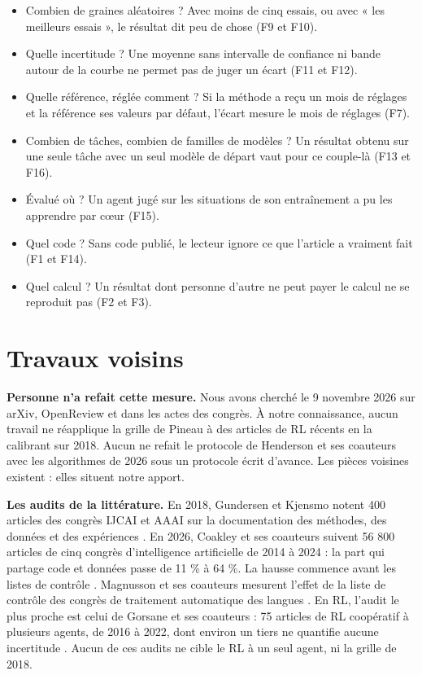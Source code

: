 \documentclass[11pt,a4paper]{article}
\providecommand{\tightlist}{\setlength{\itemsep}{0pt}\setlength{\parskip}{0pt}}
\begin{document}
\begin{itemize}
\tightlist
\item
  Combien de graines aléatoires ? Avec moins de cinq essais, ou avec «
  les meilleurs essais », le résultat dit peu de chose (F9 et F10).
\item
  Quelle incertitude ? Une moyenne sans intervalle de confiance ni bande
  autour de la courbe ne permet pas de juger un écart (F11 et F12).
\item
  Quelle référence, réglée comment ? Si la méthode a reçu un mois de
  réglages et la référence ses valeurs par défaut, l'écart mesure le
  mois de réglages (F7).
\item
  Combien de tâches, combien de familles de modèles ? Un résultat obtenu
  sur une seule tâche avec un seul modèle de départ vaut pour ce
  couple-là (F13 et F16).
\item
  Évalué où ? Un agent jugé sur les situations de son entraînement a pu
  les apprendre par cœur (F15).
\item
  Quel code ? Sans code publié, le lecteur ignore ce que l'article a
  vraiment fait (F1 et F14).
\item
  Quel calcul ? Un résultat dont personne d'autre ne peut payer le
  calcul ne se reproduit pas (F2 et F3).
\end{itemize}

\section{Travaux voisins}\label{travaux-voisins}

\textbf{Personne n'a refait cette mesure.} Nous avons cherché le 9
novembre 2026 sur arXiv, OpenReview et dans les actes des congrès. À
notre connaissance, aucun travail ne réapplique la grille de Pineau à
des articles de RL récents en la calibrant sur 2018. Aucun ne refait le
protocole de Henderson et ses coauteurs avec les algorithmes de 2026
sous un protocole écrit d'avance. Les pièces voisines existent : elles
situent notre apport.

\textbf{Les audits de la littérature.} En 2018, Gundersen et Kjensmo
notent 400 articles des congrès IJCAI et AAAI sur la documentation des
méthodes, des données et des expériences \autocite{gundersen2018state}.
En 2026, Coakley et ses coauteurs suivent 56 800 articles de cinq
congrès d'intelligence artificielle de 2014 à 2024 : la part qui partage
code et données passe de 11 \% à 64 \%. La hausse commence avant les
listes de contrôle \autocite{coakley2026shift}. Magnusson et ses
coauteurs mesurent l'effet de la liste de contrôle des congrès de
traitement automatique des langues \autocite{magnusson2023nlpchecklist}.
En RL, l'audit le plus proche est celui de Gorsane et ses coauteurs : 75
articles de RL coopératif à plusieurs agents, de 2016 à 2022, dont
environ un tiers ne quantifie aucune incertitude
\autocite{gorsane2022marl}. Aucun de ces audits ne cible le RL à un seul
agent, ni la grille de 2018.
\end{document}

